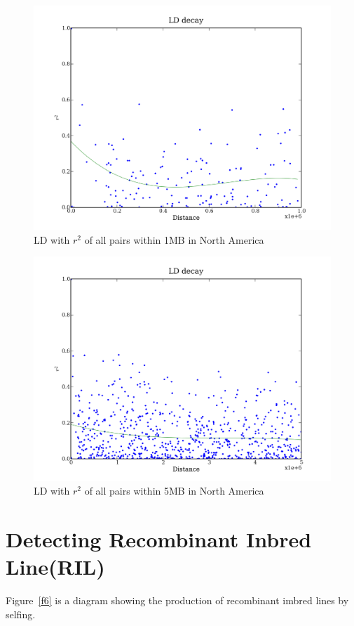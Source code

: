 \documentclass[a4paper,10pt]{article}
\begin{document}
\begin{figure}
\includegraphics[width=1\textwidth]{figures/data_NorAmer_d110_c0_5_LD_r2_1000000.png}
\caption{LD with $r^2$ of all pairs within 1MB in North America}\label{fld_15}
\end{figure}

\begin{figure}
\includegraphics[width=1\textwidth]{figures/data_NorAmer_d110_c0_5_LD_r2_5000000.png}
\caption{LD with $r^2$ of all pairs within 5MB in North America}\label{fld_16}
\end{figure}


\section{Detecting Recombinant Inbred Line(RIL)}
Figure~\ref{f6} is a diagram showing the production of recombinant imbred lines by selfing.
\end{document}
